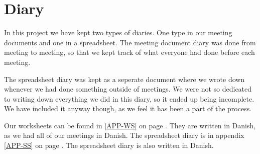 \chapter{Diary}
In this project we have kept two types of diaries. One type in our meeting
documents and one in a spreadsheet. The meeting document diary was done from
meeting to meeting, so that we kept track of what everyone had done before each
meeting.

The spreadsheet diary was kept as a seperate document where we wrote down
whenever we had done something outside of meetings. We were not so dedicated to
writing down everything we did in this diary, so it ended up being incomplete.
We have included it anyway though, as we feel it has been a part of the process.

Our worksheets can be found in \ref{APP-WS} on page \pageref{APP-WS}. They are
written in Danish, as we had all of our meetings in Danish. The spreadsheet
diary is in appendix \ref{APP-SS}  on page
\pageref{APP-SS}. The spreadsheet diary is also written in Danish.